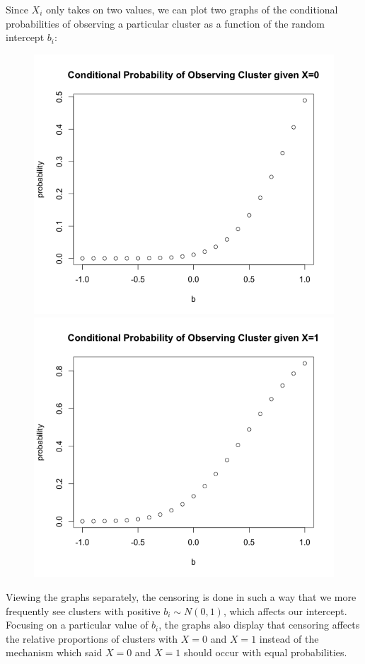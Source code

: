 \documentclass[11pt]{article}
\begin{document}
\begin{enumerate}
\begin{enumerate}
\[\]
Since $X_i$ only takes on two values, we can plot two graphs of the conditional probabilities of observing a particular cluster as a function of the random intercept $b_i$:
\begin{figure}[H]
	\includegraphics[scale=0.4]{Rplot1}
	\includegraphics[scale=0.4]{Rplot2}	
\end{figure}
Viewing the graphs separately, the censoring is done in such a way that we more frequently see clusters with positive $b_i\sim N(0,1)$, which affects our intercept. Focusing on a particular value of $b_i$, the graphs also display that censoring affects the relative proportions of clusters with $X=0$ and $X=1$ instead of the mechanism which said $X=0$ and $X=1$ should occur with equal probabilities.

\end{enumerate}
\end{enumerate}
\end{document}
